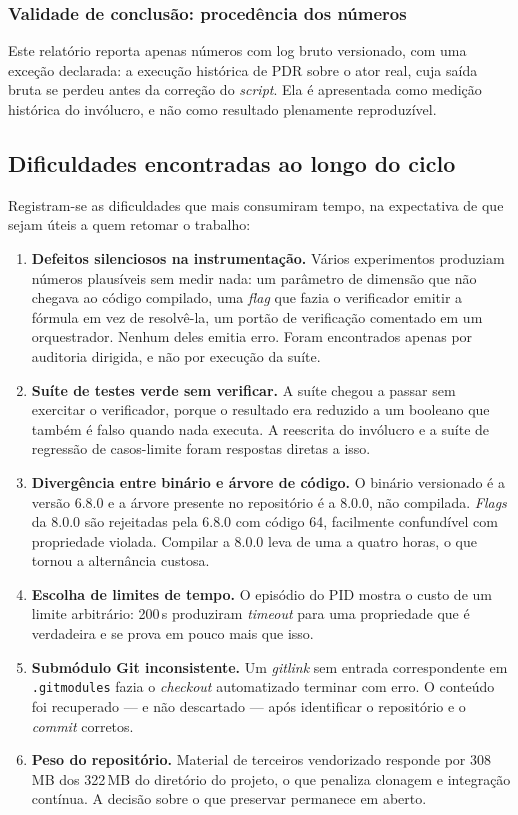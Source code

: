 \subsubsection{Validade de conclusão: procedência dos números}

Este relatório reporta apenas números com log bruto versionado, com uma exceção declarada: a
execução histórica de PDR sobre o ator real, cuja saída bruta se perdeu antes da correção do
\textit{script}. Ela é apresentada como medição histórica do invólucro, e não como resultado
plenamente reproduzível.

\subsection{Dificuldades encontradas ao longo do ciclo}

Registram-se as dificuldades que mais consumiram tempo, na expectativa de que sejam úteis a
quem retomar o trabalho:

\begin{enumerate}[leftmargin=1.4cm]
  \item \textbf{Defeitos silenciosos na instrumentação.} Vários experimentos produziam números
  plausíveis sem medir nada: um parâmetro de dimensão que não chegava ao código compilado, uma
  \textit{flag} que fazia o verificador emitir a fórmula em vez de resolvê-la, um portão de
  verificação comentado em um orquestrador. Nenhum deles emitia erro. Foram encontrados apenas
  por auditoria dirigida, e não por execução da suíte.
  \item \textbf{Suíte de testes verde sem verificar.} A suíte chegou a passar sem exercitar o
  verificador, porque o resultado era reduzido a um booleano que também é falso quando nada
  executa. A reescrita do invólucro e a suíte de regressão de casos-limite foram respostas
  diretas a isso.
  \item \textbf{Divergência entre binário e árvore de código.} O binário versionado é a versão
  6.8.0 e a árvore presente no repositório é a 8.0.0, não compilada. \textit{Flags} da 8.0.0
  são rejeitadas pela 6.8.0 com código 64, facilmente confundível com propriedade violada.
  Compilar a 8.0.0 leva de uma a quatro horas, o que tornou a alternância custosa.
  \item \textbf{Escolha de limites de tempo.} O episódio do PID mostra o custo de um limite
  arbitrário: 200\,s produziram \textit{timeout} para uma propriedade que é verdadeira e se
  prova em pouco mais que isso.
  \item \textbf{Submódulo Git inconsistente.} Um \textit{gitlink} sem entrada correspondente em
  \texttt{.gitmodules} fazia o \textit{checkout} automatizado terminar com erro. O conteúdo foi
  recuperado --- e não descartado --- após identificar o repositório e o \textit{commit}
  corretos.
  \item \textbf{Peso do repositório.} Material de terceiros vendorizado responde por
  308\,MB dos 322\,MB do diretório do projeto, o que penaliza clonagem e integração contínua.
  A decisão sobre o que preservar permanece em aberto.
\end{enumerate}

